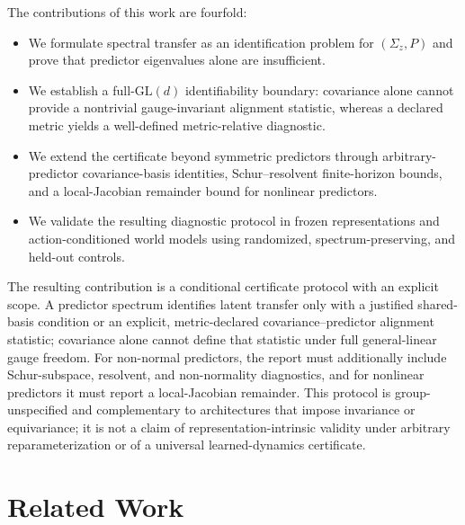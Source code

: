 \documentclass{article}
\begin{document}
The contributions of this work are fourfold:
\begin{itemize}
  \setlength{\itemsep}{1pt}
  \setlength{\parskip}{0pt}
  \setlength{\parsep}{0pt}
  \item We formulate spectral transfer as an identification problem for $(\Sigma_z,P)$ and prove that predictor eigenvalues alone are insufficient.
  \item We establish a full-$\mathrm{GL}(d)$ identifiability boundary: covariance alone cannot provide a nontrivial gauge-invariant alignment statistic, whereas a declared metric yields a well-defined metric-relative diagnostic.
  \item We extend the certificate beyond symmetric predictors through arbitrary-predictor covariance-basis identities, Schur--resolvent finite-horizon bounds, and a local-Jacobian remainder bound for nonlinear predictors.
  \item We validate the resulting diagnostic protocol in frozen representations and action-conditioned world models using randomized, spectrum-preserving, and held-out controls.
\end{itemize}

The resulting contribution is a conditional certificate protocol with an
explicit scope. A predictor spectrum identifies latent transfer only with a
justified shared-basis condition or an explicit, metric-declared
covariance--predictor alignment statistic; covariance alone cannot define that
statistic under full general-linear gauge freedom. For non-normal predictors,
the report must additionally include Schur-subspace, resolvent, and
non-normality diagnostics, and for nonlinear predictors it must report a
local-Jacobian remainder. This protocol is group-unspecified and complementary
to architectures that impose invariance or equivariance; it is not a claim of
representation-intrinsic validity under arbitrary reparameterization or of a
universal learned-dynamics certificate.

\section{Related Work}
\end{document}
